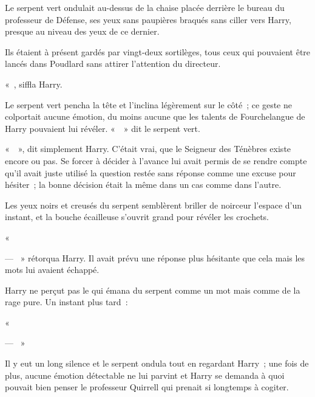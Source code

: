 Le serpent vert ondulait au-dessus de la chaise placée derrière le bureau du professeur de Défense, ses yeux sans paupières braqués sans ciller vers Harry, presque au niveau des yeux de ce dernier.

Ils étaient à présent gardés par vingt-deux sortilèges, tous ceux qui pouvaient être lancés dans Poudlard sans attirer l'attention du directeur.

«~, siffla Harry.

Le serpent vert pencha la tête et l'inclina légèrement sur le côté~; ce geste ne colportait aucune émotion, du moins aucune que les talents de Fourchelangue de Harry pouvaient lui révéler.
«~~» dit le serpent vert.

«~~», dit simplement Harry.
C'était vrai, que le Seigneur des Ténèbres existe encore ou pas.
Se forcer à décider à l'avance lui avait permis de se rendre compte qu'il avait juste utilisé la question restée sans réponse comme une excuse pour hésiter~; la bonne décision était la même dans un cas comme dans l'autre.

Les yeux noirs et creusés du serpent semblèrent briller de noirceur l'espace d'un instant, et la bouche écailleuse s'ouvrit grand pour révéler les crochets.

«~

--- ~» rétorqua Harry.
Il avait prévu une réponse plus hésitante que cela mais les mots lui avaient échappé.

Harry ne perçut pas le  qui émana du serpent comme un mot mais comme de la rage pure.
Un instant plus tard~:

«~

--- ~»

Il y eut un long silence et le serpent ondula tout en regardant Harry~; une fois de plus, aucune émotion détectable ne lui parvint et Harry se demanda à quoi pouvait bien penser le professeur Quirrell qui prenait si longtemps à cogiter.

